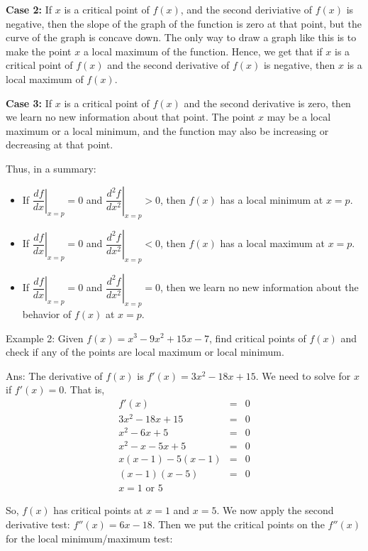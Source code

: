 \documentclass[conference,final,11pt,technote,onecolumn]{IEEEtran}\usepackage[]{graphicx}\usepackage[]{color}
\begin{document}
 \textbf{Case 2:} If $x$ is a critical point of $f(x)$, and the second deriviative of $f(x)$ is negative, then the slope of the graph of the function is zero at that point, but the curve of the graph is concave down. The only way to draw a graph like this is to make the point $x$ a local maximum of the function. Hence, we get that if $x$ is a critical point of $f(x)$ and the second derivative of $f(x)$ is negative, then $x$ is a local maximum of $f(x)$.
 
 \textbf{Case 3:} If $x$ is a critical point of $f(x)$ and the second derivative is zero, then we learn no new information about that point. The point $x$ may be a local maximum or a local minimum, and the function may also be increasing or decreasing at that point.
 
 Thus, in a summary:
 \begin{itemize}
 	\item If $\left.\dfrac{df}{dx}\right|_{x=p} = 0$ and $\left. \dfrac{d^2f}{dx^2}\right|_{x=p} > 0$, then $f(x)$ has a local minimum at $x=p$.
 	\item If $\left.\dfrac{df}{dx}\right|_{x=p} = 0$ and $\left. \dfrac{d^2f}{dx^2}\right|_{x=p} < 0$, then $f(x)$ has a local maximum at $x=p$.
 	\item If $\left.\dfrac{df}{dx}\right|_{x=p} = 0$ and $\left. \dfrac{d^2f}{dx^2}\right|_{x=p} = 0$, then we learn no new information about the behavior of $f(x)$ at $x=p$.
 \end{itemize}
 
 Example 2: Given $f(x) = x^3 - 9x^2 + 15x - 7$, find critical points of $f(x)$ and check if any of the points are local maximum or local minimum.

 Ans: The derivative of $f(x)$ is $f'(x) = 3x^2 - 18x + 15$. We need to solve for $x$ if $f'(x)=0$. That is,
 \begin{eqnarray}
 \nonumber f'(x) &=& 0\\
 \nonumber 3x^2-18x+15 &=& 0\\
 \nonumber x^2 - 6x + 5 &=& 0\\
 \nonumber x^2 - x - 5x + 5 &=& 0\\
 \nonumber x(x-1) - 5(x-1) &=& 0\\
 \nonumber (x-1)(x-5) &=& 0\\
 \nonumber x = \text{1 or 5}
 \end{eqnarray}

 So, $f(x)$ has critical points at $x=1$ and $x=5$. We now apply the second derivative test: $f''(x) = 6x-18$. Then we put the critical points on the $f''(x)$ for the local minimum/maximum test:
 
\end{document}
